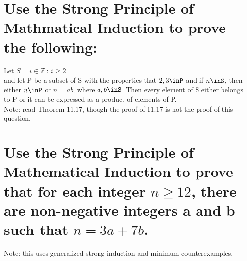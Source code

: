 \section{Use the Strong Principle of Mathmatical Induction to prove the following:}
Let $S={i\in\mathbb{Z}\ : \ i\geq2}$\\
and let P be a subset of S with the properties that $2,3\inP$ and if $n\inS$, then either $n\inP$ or $n=ab$, where $a,b\inS$.
Then every element of S either belongs to P or it can be expressed as a product of elements of P.\\
Note: read Theorem 11.17, though the proof of 11.17 is not the proof of this question.


\section{Use the Strong Principle of Mathematical Induction to prove that for each integer $n\geq 12$, there are non-negative integers a and b such that $n = 3a + 7b$.} 
Note: this uses generalized strong induction and minimum counterexamples.



 
